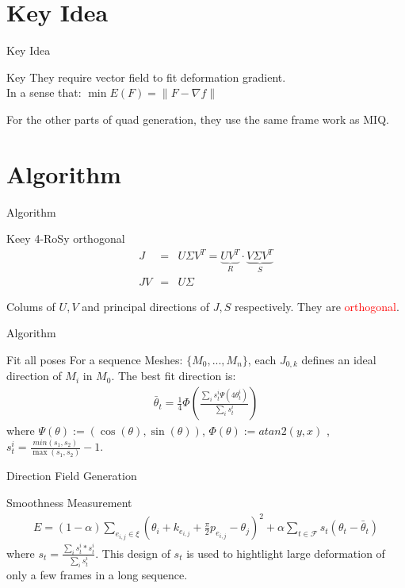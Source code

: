 \documentclass{beamer}
\begin{document}
\section{Key Idea}
\begin{frame}{Key Idea}
\begin{block}{Key}
They require vector field to fit deformation gradient.\\
In a sense that: $\min E(F)=\|F-\nabla f\|$
\end{block}
For the other parts of quad generation, they use the same frame work as MIQ.
\end{frame}

\section{Algorithm}
\begin{frame}{Algorithm}
\begin{block}{Keey 4-RoSy orthogonal}
\begin{eqnarray}
J&=&U\Sigma V^T=\underbrace{UV^T}_{R}\cdot \underbrace{V\Sigma V^T}_{S}\\
JV&=&U\Sigma
\end{eqnarray}
\end{block}
Colums of $U,V$ and principal directions of $J,S$ respectively. They are \textcolor{red}{orthogonal}.
\end{frame}

\begin{frame}{Algorithm}
\begin{block}{Fit all poses}
For a sequence Meshes: $\{M_0,...,M_n\}$, each $J_{0,k}$ defines an ideal direction of $M_i$ in $M_0$.
The best fit direction is:
\begin{eqnarray}
\bar{\theta}_t=\frac{1}{4}\Phi(\frac{\sum_i s^i_t \Psi(4\theta^i_t)}{\sum_i s^i_t})
\end{eqnarray}
where $\Psi(\theta):=(\cos(\theta),\sin(\theta))$, $\Phi(\theta):=atan2(y,x)$ , $s_t^i=\frac{min(s_1,s_2)}{\max(s_1,s_2)}-1$.
\end{block}
\end{frame}

\begin{frame}{Direction Field Generation}
\begin{block}{Smoothness Measurement}
\begin{eqnarray}
E=(1-\alpha)\sum_{e_{i,j}\in \xi}(\theta_i+k_{e_{i,j}}+\frac{\pi}{2}p_{e_{i,j}}-\theta_j)^2+\alpha \sum_{t\in \mathcal{F}} s_t(\theta_t-\bar{\theta}_t)
\end{eqnarray}
where $s_t=\frac{\sum_i s^i_t*s^i_t}{\sum_i s^i_t}$. This design of $s_t$ is used to hightlight large deformation of only a few frames in a long sequence.
\end{block}
\end{frame}
\end{document}
